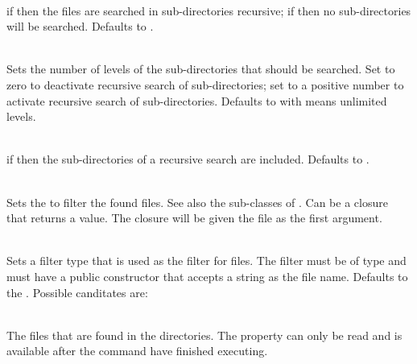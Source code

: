 \begin{asparadesc}
%
\item[\code{recursive: true|false}] \hfill \\
if  then the files are searched in sub-directories recursive;
if  then no sub-directories will be searched. Defaults to .
%
\item[\code{depth: (+)number|-1}] \hfill \\
Sets the number of levels of the sub-directories that should be searched.
Set to zero to deactivate recursive search of sub-directories; set to a positive
number to activate recursive search of sub-directories.
Defaults to  with means unlimited levels.
%
\item[\code{includeSubDirectories: true|false}] \hfill \\
if  then the sub-directories of a recursive search are included.
Defaults to .
%
\item[\code{filter: FileFilter|closure}] \hfill \\
Sets the \cite{filefilter13} to filter the found files.
See also the sub-classes of \cite{abstractfilefilter13}.
Can be a closure that returns a  value. The closure will be given
the file\cite{file13} as the first argument.
%
\item[\code{filterType: class}] \hfill \\
Sets a filter type that is used as the filter for files. The filter 
must be of type \cite{filefilter13} and must have
a public constructor that accepts a string as the file name. Defaults
to the \cite{wildcardfilefilter13}. Possible canditates
are:
\begin{compactitem}
\item {}
\item {}
\item {}
\item {}
\item {}
\end{compactitem}
%
\item[\code{theFiles}] \hfill \\
The files that are found in the directories. The property can only be read and
is available after the command have finished executing.
%
\end{asparadesc}

